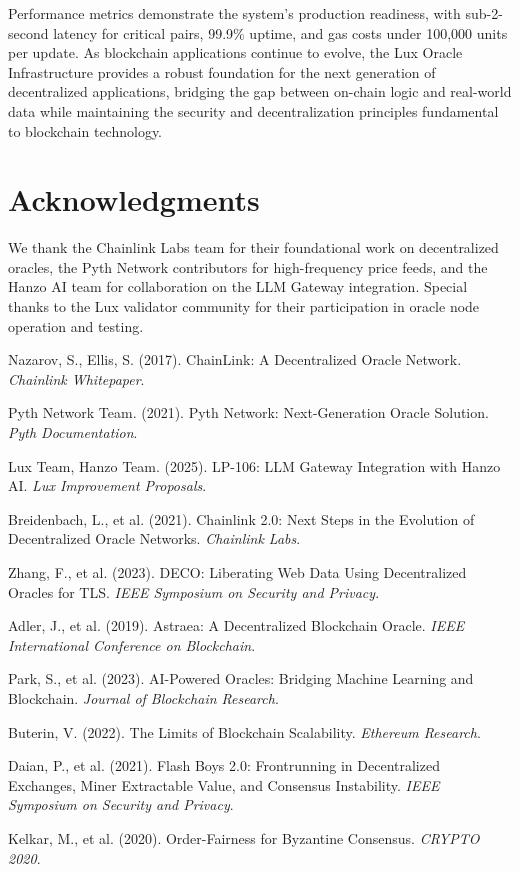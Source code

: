 \documentclass[11pt]{article}
\begin{document}
Performance metrics demonstrate the system's production readiness, with sub-2-second latency for critical pairs, 99.9\% uptime, and gas costs under 100,000 units per update. As blockchain applications continue to evolve, the Lux Oracle Infrastructure provides a robust foundation for the next generation of decentralized applications, bridging the gap between on-chain logic and real-world data while maintaining the security and decentralization principles fundamental to blockchain technology.

\section*{Acknowledgments}

We thank the Chainlink Labs team for their foundational work on decentralized oracles, the Pyth Network contributors for high-frequency price feeds, and the Hanzo AI team for collaboration on the LLM Gateway integration. Special thanks to the Lux validator community for their participation in oracle node operation and testing.

\begin{thebibliography}{99}

 Nazarov, S., Ellis, S. (2017). ChainLink: A Decentralized Oracle Network. \textit{Chainlink Whitepaper}.

 Pyth Network Team. (2021). Pyth Network: Next-Generation Oracle Solution. \textit{Pyth Documentation}.

 Lux Team, Hanzo Team. (2025). LP-106: LLM Gateway Integration with Hanzo AI. \textit{Lux Improvement Proposals}.

 Breidenbach, L., et al. (2021). Chainlink 2.0: Next Steps in the Evolution of Decentralized Oracle Networks. \textit{Chainlink Labs}.

 Zhang, F., et al. (2023). DECO: Liberating Web Data Using Decentralized Oracles for TLS. \textit{IEEE Symposium on Security and Privacy}.

 Adler, J., et al. (2019). Astraea: A Decentralized Blockchain Oracle. \textit{IEEE International Conference on Blockchain}.

 Park, S., et al. (2023). AI-Powered Oracles: Bridging Machine Learning and Blockchain. \textit{Journal of Blockchain Research}.

 Buterin, V. (2022). The Limits of Blockchain Scalability. \textit{Ethereum Research}.

 Daian, P., et al. (2021). Flash Boys 2.0: Frontrunning in Decentralized Exchanges, Miner Extractable Value, and Consensus Instability. \textit{IEEE Symposium on Security and Privacy}.

 Kelkar, M., et al. (2020). Order-Fairness for Byzantine Consensus. \textit{CRYPTO 2020}.

\end{thebibliography}
\end{document}
